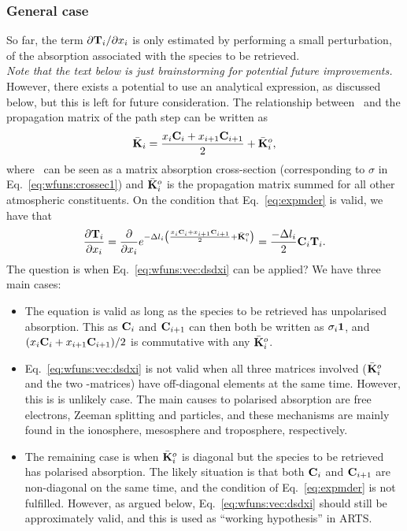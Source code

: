 \subsubsection{General case}
%
So far, the term $\partial\mathbf{T}_{i}/\partial x_{i}$ is only estimated by
performing a small perturbation, of the absorption associated with the species
to be retrieved.\\

\noindent
{\it Note that the text below is just brainstorming for potential future improvements.}
However, there exists a potential to use an analytical expression, as discussed
below, but this is left for future consideration. The relationship between
\ and the propagation matrix of the path step can be written as
\begin{equation}
  \bar{{\bf K}}_i = \frac{x_{i}\mathbf{C}_i+
                      x_{i+1}\mathbf{C}_{i+1}}{2} + \bar{{\bf K}}_i^o,
\end{equation}
where \ can be seen as a matrix absorption cross-section
(corresponding to $\sigma$ in Eq.~\ref{eq:wfuns:crossec1}) and
$\bar{{\bf K}}_i^o$ is the propagation matrix summed for all other atmospheric
constituents. 
On the condition that Eq.~\ref{eq:expmder} is valid, we have that
\begin{equation}
  \frac{\partial\mathbf{T}_{i}}{\partial x_{i}} = 
  \frac{\partial}{\partial x_{i}} 
  e^{-\Delta l_{i}\left(\frac{x_{i}\mathbf{C}_i+
            x_{i+1}\mathbf{C}_{i+1}}{2} + \bar{{\bf K}}_i^o \right)} =
  \frac{-\Delta l_{i}}{2} \mathbf{C}_i\mathbf{T}_{i}.
  \label{eq:wfuns:vec:dsdxi}
\end{equation}
The question is when Eq.~\ref{eq:wfuns:vec:dsdxi} can be applied? We have three
main cases:
\begin{itemize}
\item The equation is valid as long as the species to be retrieved has
  unpolarised absorption. This as $\mathbf{C}_i$ and $\mathbf{C}_{i+1}$ can
  then both be written as $\sigma_i\mathbf{1}$, and
  $(x_{i}\mathbf{C}_i+x_{i+1}\mathbf{C}_{i+1})/2$ is commutative
  with any $\bar{{\bf K}}_i^o$.
\item Eq.~\ref{eq:wfuns:vec:dsdxi} is not valid when all three matrices
  involved ($\bar{{\bf K}}_i^o$ and the two -matrices) have
  off-diagonal elements at the same time. However, this is is unlikely case.
  The main causes to polarised absorption are free electrons, Zeeman splitting
  and particles, and these mechanisms are mainly found in the ionosphere,
  mesosphere and troposphere, respectively.
\item The remaining case is when $\bar{{\bf K}}_i^o$ is diagonal but the
  species to be retrieved has polarised absorption. The likely situation is
  that both $\mathbf{C}_i$ and $\mathbf{C}_{i+1}$ are non-diagonal on the same
  time, and the condition of Eq.~\ref{eq:expmder} is not fulfilled. However, as
  argued below, Eq.~\ref{eq:wfuns:vec:dsdxi} should still be approximately
  valid, and this is used as ``working hypothesis'' in ARTS.
\end{itemize}
